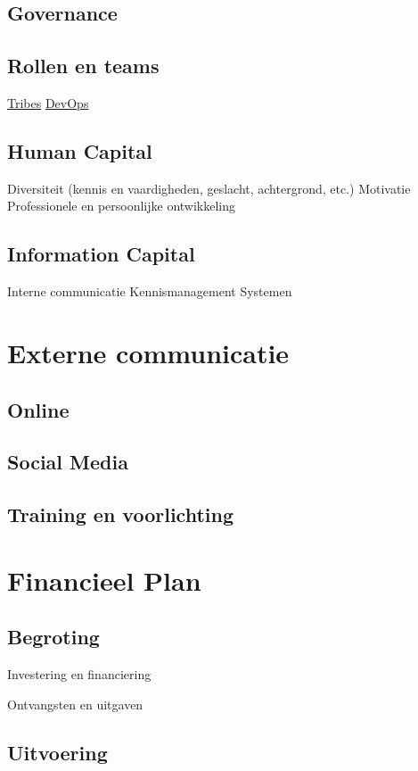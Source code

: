 \documentclass[]{book}
\begin{document}
\section{Governance}\label{governance}

\section{Rollen en teams}\label{rollen-en-teams}

\href{https://techbeacon.com/teams-tribes-creating-one-team-culture-devops}{Tribes}
\citet{campbell-pretty_teams_nodate}
\href{https://en.wikipedia.org/wiki/DevOps}{DevOps}

\section{Human Capital}\label{human-capital}

Diversiteit (kennis en vaardigheden, geslacht, achtergrond, etc.)
Motivatie Professionele en persoonlijke ontwikkeling

\section{Information Capital}\label{information-capital}

Interne communicatie Kennismanagement Systemen

\chapter{Externe communicatie}\label{externe-communicatie}

\section{Online}\label{online}

\section{Social Media}\label{social-media}

\section{Training en voorlichting}\label{training-en-voorlichting}

\chapter{Financieel Plan}\label{financieel-plan}

\section{Begroting}\label{begroting}

Investering en financiering

Ontvangsten en uitgaven

\section{Uitvoering}\label{uitvoering}


\end{document}
